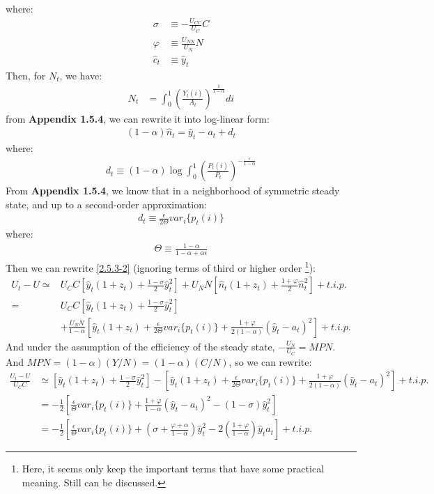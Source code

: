 \documentclass{article}
\numberwithin{equation}{section}
\begin{document}
where:
	\begin{align*}
		\sigma &\equiv -\frac{U_{CC}}{U_C}C\\
		\varphi &\equiv \frac{U_{NN}}{U_N}N\\
		\hat{c}_t &\equiv \hat{y}_t
	\end{align*}
Then, for $N_t$, we have:
	\begin{align*}
		N_t &= \int^1_0 \left( \frac{Y_t(i)}{A_t} \right)^{\frac{1}{1 - \alpha}} di
	\end{align*}
from \textbf{Appendix 1.5.4}, we can rewrite it into log-linear form:
	\begin{align*}
		(1 - \alpha)\hat{n}_t = \hat{y}_t - a_t + d_t
	\end{align*}
where:
	\begin{align*}
		d_t \equiv (1 - \alpha) \log\int^1_0 \left( \frac{P_t(i)}{P_t} \right)^{-\frac{\epsilon}{1 - \alpha}}
	\end{align*}
From \textbf{Appendix 1.5.4}, we know that in a neighborhood of symmetric steady state, and up to a second-order approximation:
	\begin{align*}
		d_t \equiv \frac{\epsilon}{2\Theta} var_i\{ p_t(i) \}
	\end{align*}
where:
	\begin{align*}
		\Theta \equiv \frac{1 - \alpha}{1 - \alpha + \alpha\epsilon}
	\end{align*}
Then we can rewrite \eqref{2.5.3-2} (ignoring terms of third or higher order
\footnote{Here, it seems only keep the important terms that have some practical meaning. Still can be discussed.}):
	\begin{align*}
		U_t - U \simeq &U_C C \left[ \hat{y}_t (1 + z_t) + \frac{1 - \sigma}{2} \hat{y}^2_t \right] + U_N N \left[ \hat{n}_t (1 + z_t) + \frac{1 + \varphi}{2} \hat{n}^2_t \right] + t.i.p.\\
		= & U_C C \left[ \hat{y}_t (1 + z_t) + \frac{1 - \sigma}{2} \hat{y}^2_t \right]\\
		&+ \frac{U_N N}{1 - \alpha} \left[ \hat{y}_t (1 + z_t) + \frac{\epsilon}{2\Theta} var_i\{ p_t(i) \} + \frac{1 + \varphi}{2(1 - \alpha)} \left( \hat{y}_t - a_t \right)^2 \right] + t.i.p.
	\end{align*}
And under the assumption of the efficiency of the steady state, $-\frac{U_N}{U_C} = MPN$. And $MPN = (1 - \alpha)(Y/N) = (1 - \alpha)(C/N)$, so we can rewrite:
	\begin{align}
		\frac{U_t - U}{U_C C} &\simeq \left[ \hat{y}_t (1 + z_t) + \frac{1 - \sigma}{2} \hat{y}^2_t \right] - \left[ \hat{y}_t (1 + z_t) + \frac{\epsilon}{2\Theta} var_i\{ p_t(i) \} + \frac{1 + \varphi}{2(1 - \alpha)} \left( \hat{y}_t - a_t \right)^2 \right] + t.i.p. \nonumber\\
		&= -\frac{1}{2} \left[ \frac{\epsilon}{\Theta} var_i\{ p_t(i) \} + \frac{1 + \varphi}{1 - \alpha} \left( \hat{y}_t - a_t \right)^2 - (1 - \sigma)\hat{y}^2_t \right] \nonumber\\
		&= -\frac{1}{2} \left[ \frac{\epsilon}{\Theta} var_i\{ p_t(i) \} + \left( \sigma + \frac{\varphi + \alpha}{1 - \alpha} \right) \hat{y}^2_t - 2 \left( \frac{1 + \varphi}{1 - \alpha} \right) \hat{y}_ta_t \right] + t.i.p. \label{2.5.3-3}
	\end{align}
\end{document}
